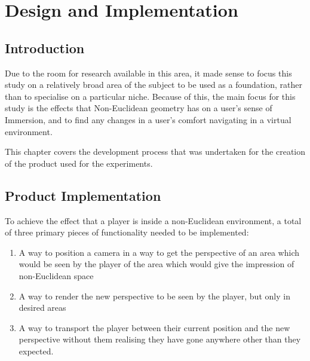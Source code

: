 \chapter[Product]{Design and Implementation}
\label{design}

	\section{Introduction}
	\label{design:intro}

		Due to the room for research available in this area, it made sense to focus this study on a relatively broad area of the subject to be used as a foundation, rather than to specialise on a particular niche.
		Because of this, the main focus for this study is the effects that Non-Euclidean geometry has on a user's sense of Immersion, and to find any changes in a user's comfort navigating in a virtual environment.

		This chapter covers the development process that was undertaken for the creation of the product used for the experiments.






	\section[Implementation]{Product Implementation}
	\label{design:model}

		To achieve the effect that a player is inside a non-Euclidean environment, a total of three primary pieces of functionality needed to be implemented:
		\begin{enumerate}
			\item A way to position a camera in a way to get the perspective of an area which would be seen by the player of the area which would give the impression of non-Euclidean space
			\item A way to render the new perspective to be seen by the player, but only in desired areas
			\item A way to transport the player between their current position and the new perspective without them realising they have gone anywhere other than they expected.
		\end{enumerate}

